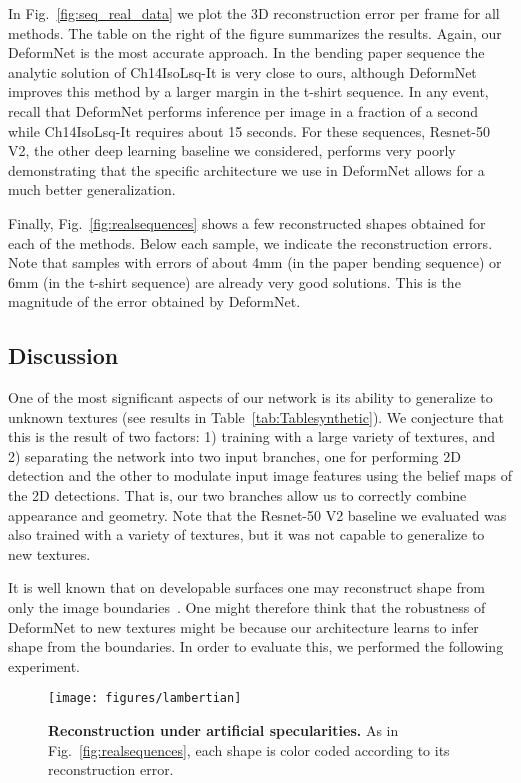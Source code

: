 \documentclass[10pt,twocolumn,letterpaper]{article}
\begin{document}
 
In Fig.~\ref{fig:seq_real_data} we plot the  3D reconstruction error per frame for all methods.  The table on the right of the figure  summarizes the results. Again, our DeformNet is the most accurate approach. In the bending paper sequence the analytic solution of Ch14IsoLsq-It is very close to ours, although DeformNet improves this method by a larger margin in the t-shirt sequence.  In any event, recall that DeformNet performs inference per image in a fraction of a second while Ch14IsoLsq-It requires about 15 seconds. For these sequences, Resnet-50 V2, the other deep learning baseline we considered, performs very poorly demonstrating that the specific architecture we use in DeformNet allows for a much better generalization. 

 

Finally,   Fig.~\ref{fig:realsequences} shows a few reconstructed shapes obtained for each of the methods. Below each sample, we indicate the reconstruction errors. Note that samples with errors of about 4mm (in the paper bending sequence) or 6mm (in the t-shirt sequence) are already very good solutions. This is the magnitude of the error obtained by DeformNet.



 
\subsection{Discussion}
One of the most  significant aspects of our network is its ability to generalize to unknown textures (see results in Table~\ref{tab:Tablesynthetic}). We conjecture that this is the result of two factors: 1) training with a large variety of textures, and 2) separating the network into two input branches, one for performing 2D detection and the other to modulate input image features using the belief maps of the 2D detections. That is, our two branches allow us to correctly combine appearance and geometry. Note that the Resnet-50 V2 baseline we evaluated was also trained with a variety of textures, but it was not capable to generalize to new textures.

It is well known that on developable surfaces one may reconstruct shape from only the image boundaries~\cite{gumerov2004structure}. One might therefore think that the robustness of DeformNet to new textures might  be because our architecture learns to infer shape from the boundaries. In order to evaluate this, we performed the following experiment.

\begin{figure}[t!]
  	\texttt{[image: figures/lambertian]}		
  \caption{{\bf Reconstruction under artificial specularities.} As in  Fig.~\ref{fig:realsequences}, each shape is color coded according to its reconstruction error.}
  \label{fig:lambertian}	
  \vspace{-2mm}
\end{figure}
\end{document}

